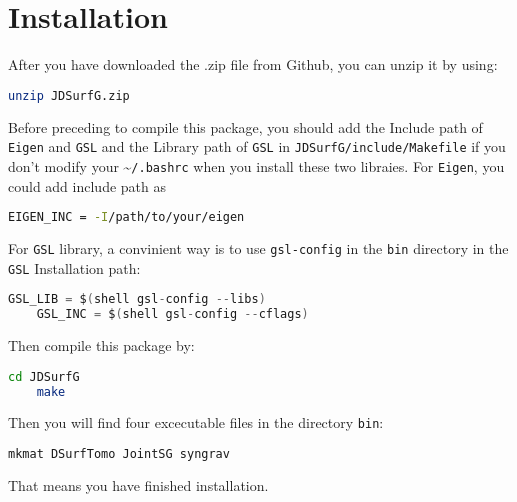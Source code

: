 \documentclass[UTF8]{article}
\begin{document}
\section{Installation}
After you have downloaded the .zip file from Github,
you can unzip it by using:
\begin{lstlisting}[language=bash]
    unzip JDSurfG.zip
\end{lstlisting}
Before preceding to compile this package, you should 
add the Include path of \texttt{Eigen} and \texttt{GSL} 
and the Library path of \texttt{GSL} in 
\texttt{JDSurfG/include/Makefile} if you don't modify your 
\textasciitilde \texttt{/.bashrc} when you install these
two libraies. For \texttt{Eigen}, you could add include path
as
\begin{lstlisting}[language=bash]
    EIGEN_INC = -I/path/to/your/eigen
\end{lstlisting}
For \texttt{GSL} library, a convinient way is to 
use \texttt{gsl-config} in the \texttt{bin}
directory in the \texttt{GSL} Installation path:
\begin{lstlisting}[language=c]
    GSL_LIB = $(shell gsl-config --libs)
    GSL_INC = $(shell gsl-config --cflags)
\end{lstlisting}

Then compile this package by:
\begin{lstlisting}[language=bash]
    cd JDSurfG
    make
\end{lstlisting}
Then you will find four excecutable files in the 
directory \texttt{bin}:
\begin{lstlisting}[language=bash]
    mkmat DSurfTomo JointSG syngrav  
\end{lstlisting}
That means you have finished installation. \\
\end{document}
